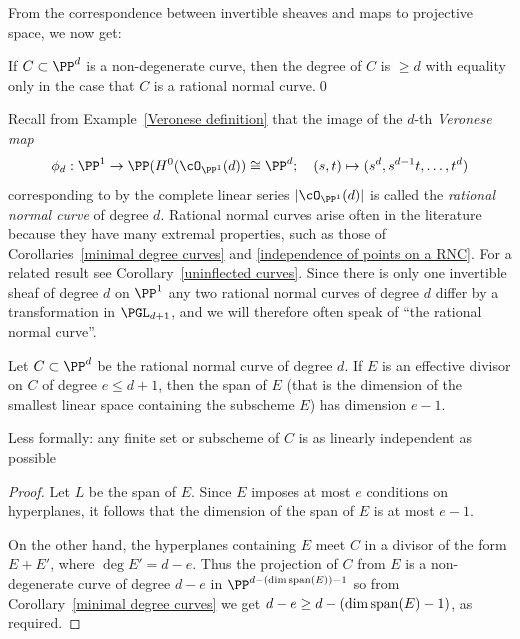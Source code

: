 From the correspondence between invertible sheaves and maps to projective space, we now get:
\begin{corollary}\label{minimal degree curves}
If $C\subset \PP^d$ is a  non-degenerate curve, then the degree of $C$ is $\geq d$ with equality only in the case
that $C$ is a rational normal curve.\qed
\end{corollary}

Recall from Example~\ref{Veronese definition} that the image of the $d$-th \emph{Veronese map}  
$$
\phi_d: \PP^1 \to \PP(H^0(\cO_{\PP^1}(d)) \cong \PP^d; \quad (s,t) \mapsto (s^d, s^{d-1}t, \dots, t^d)
$$
corresponding to by the complete linear series $|\cO_{\PP^1}(d)|$ is called the \emph{rational normal curve} of degree $d$. Rational normal curves arise often in the literature because they have many extremal properties, such as those of Corollaries~\ref{minimal degree curves} and \ref{independence of points on a RNC}. For a related result see Corollary~\ref{uninflected curves}. Since there is only
one invertible sheaf of degree $d$ on $\PP^1$ any two rational normal curves of degree $d$ differ by a transformation in $\PGL_{d+1}$,
and we will therefore often speak of ``the rational normal curve''.

\begin{corollary}\label{independence of points on a RNC}
Let $C\subset \PP^d$ be the rational normal curve of degree $d$. If $E$ is an effective divisor on $C$ of degree $e\leq d+1$, then the
span of $E$ (that is the dimension of the smallest linear space containing the subscheme $E$) has dimension $e-1$.
\end{corollary}
Less formally: any finite set or subscheme of $C$ is as linearly independent as possible

\begin{proof}
Let $L$ be the span of $E$. Since $E$  imposes at most $e$ conditions on hyperplanes, it follows that the dimension of the span of $E$ is
at most $e-1$.

On the other hand, the hyperplanes containing $E$ meet $C$ in a divisor of the form $E+E'$, where
$\deg E' = d-e$. Thus the projection of $C$ from $E$ is a non-degenerate curve of degree $d-e$ in $\PP^{d-(\dim {\rm span}(E))-1}$
so from Corollary~\ref{minimal degree curves} we get $d-e \geq d-(\dim {\rm span}(E)-1)$, as required.
\end{proof}

